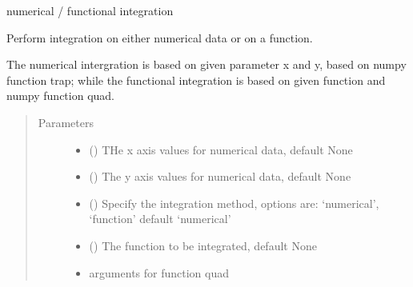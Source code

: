 \documentclass[letterpaper,10pt,english]{sphinxmanual}
\begin{document}

\begin{fulllineitems}
\label{\detokenize{scibeam.core:scibeam.core.numerical.integrate}}
numerical / functional integration

Perform integration on either numerical data or on a function.

The numerical intergration is based on given parameter x and y, based on
numpy function trap; while the functional integration is based on given
function and numpy function quad.
\begin{quote}\begin{description}
\item[{Parameters}] \leavevmode\begin{itemize}
\item {} 
 () \textendash{} THe x axis values for numerical data, default None

\item {} 
 () \textendash{} The y axis values for numerical data, default None

\item {} 
 () \textendash{} Specify the integration method, options are: ‘numerical’, ‘function’
default ‘numerical’

\item {} 
 () \textendash{} The function to be integrated, default None

\item {} 
 \textendash{} arguments for function quad

\end{itemize}

\end{description}\end{quote}

\end{fulllineitems}
\end{document}
